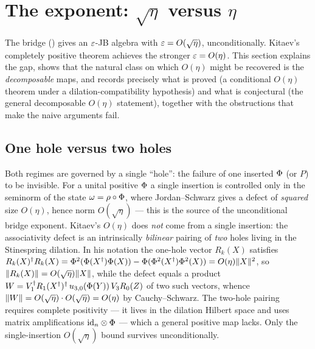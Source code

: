 \section{The exponent: \texorpdfstring{$\sqrt\eta$}{root eta} versus
\texorpdfstring{$\eta$}{eta}}\label{sec:exponent}

The bridge () gives an $\varepsilon$-JB algebra with
$\varepsilon=O(\sqrt\eta)$, unconditionally. Kitaev's completely positive theorem
achieves the stronger $\varepsilon=O(\eta)$. This section explains the gap, shows that
the natural class on which $O(\eta)$ might be recovered is the
\emph{decomposable} maps, and records precisely what is proved (a conditional
$O(\eta)$ theorem under a dilation-compatibility hypothesis) and what is
conjectural (the general decomposable $O(\eta)$ statement), together with the
obstructions that make the naive arguments fail.

\subsection{One hole versus two holes}

\begin{remark}
\label{rem:exponent}
Both regimes are governed by a single ``hole'': the failure of one inserted
$\Phi$ (or $P$) to be invisible. For a unital positive $\Phi$ a single
insertion is controlled only in the seminorm of the state
$\omega=\rho\circ\Phi$, where Jordan--Schwarz gives a defect of \emph{squared}
size $O(\eta)$, hence norm $O(\sqrt\eta)$ --- this is the source of the
unconditional bridge exponent. Kitaev's $O(\eta)$ does \emph{not} come from a
single insertion: the associativity defect is an intrinsically \emph{bilinear}
pairing of \emph{two} holes living in the Stinespring dilation. In his notation
the one-hole vector $R_k(X)$ satisfies
$R_k(X)^{\dagger}R_k(X)=\Phi^2(\Phi(X^{\dagger})\Phi(X))
-\Phi(\Phi^2(X^{\dagger})\Phi^2(X))=O(\eta)\lVert X \rVert^2$, so
$\lVert R_k(X) \rVert=O(\sqrt\eta)\lVert X \rVert$, while the defect equals a product
$W=V_1^{\dagger}R_1(X^{\dagger})^{\dagger}\,u_{3,0}(\Phi(Y))\,V_3R_0(Z)$ of two
such vectors, whence $\lVert W \rVert=O(\sqrt\eta)\cdot O(\sqrt\eta)=O(\eta)$ by
Cauchy--Schwarz. The two-hole pairing requires complete positivity --- it lives
in the dilation Hilbert space and uses matrix amplifications
$\mathrm{id}_n\otimes\Phi$ --- which a general positive map lacks. Only the
single-insertion $O(\sqrt\eta)$ bound survives unconditionally.
\end{remark}

